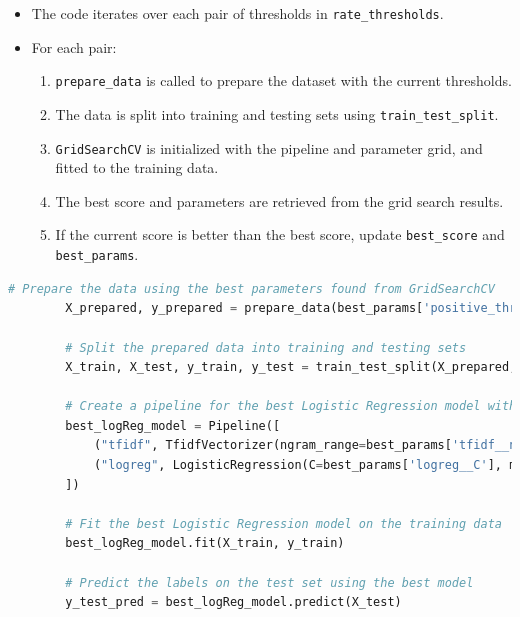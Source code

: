 \documentclass{solutionclass} %
\begin{document}
\begin{solution}
        \begin{itemize}
            \item The code iterates over each pair of thresholds in \texttt{rate\_thresholds}.
            \item For each pair:
            \begin{enumerate}
                \item \texttt{prepare\_data} is called to prepare the dataset with the current thresholds.
                \item The data is split into training and testing sets using \texttt{train\_test\_split}.
                \item \texttt{GridSearchCV} is initialized with the pipeline and parameter grid, and fitted to the training data.
                \item The best score and parameters are retrieved from the grid search results.
                \item If the current score is better than the best score, update \texttt{best\_score} and \texttt{best\_params}.
            \end{enumerate}
        \end{itemize}
        
        \begin{lstlisting}[language=Python]
        # Prepare the data using the best parameters found from GridSearchCV
        X_prepared, y_prepared = prepare_data(best_params['positive_threshold'], best_params['neutral_threshold'])
        
        # Split the prepared data into training and testing sets
        X_train, X_test, y_train, y_test = train_test_split(X_prepared, y_prepared, test_size=0.1, random_state=42)
        
        # Create a pipeline for the best Logistic Regression model with the best parameters
        best_logReg_model = Pipeline([
            ("tfidf", TfidfVectorizer(ngram_range=best_params['tfidf__ngram_range'], max_features=best_params['tfidf__max_features'])),
            ("logreg", LogisticRegression(C=best_params['logreg__C'], max_iter=500, solver='newton-cg'))
        ])
        
        # Fit the best Logistic Regression model on the training data
        best_logReg_model.fit(X_train, y_train)
        
        # Predict the labels on the test set using the best model
        y_test_pred = best_logReg_model.predict(X_test)
        

\end{lstlisting}
\end{solution}
\end{document}
